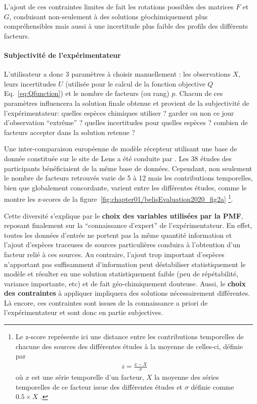 L'ajout de ces contraintes limites de fait les rotations possibles des matrices $F$ et
$G$, conduisant non-seulement à des solutions géochimiquement plus compréhensibles mais
aussi à une incertitude plus faible des profils des différents facteurs.

\paragraph{Subjectivité de l'expérimentateur}%
\label{par:subjectivité_de_l_expérimentateur}

L'utilisateur a donc 3 paramètres à choisir manuellement : les observations $X$, leurs
incertitudes $U$ (utilisée pour le calcul de la fonction objective $Q$
Eq.~\ref{eq:Qfunction}) et le nombre de facteurs (ou rang) $p$. Chacun de ces paramètres
influencera la solution finale obtenue et provient de la subjectivité de l'expérimentateur:
quelles espèces chimiques utiliser ? garder ou non ce jour d'observation ``extrême'' ?
quelles incertitudes pour quelles espèces ? combien de facteurs accepter dans la solution
retenue ?

Une inter-comparaison européenne de modèle récepteur utilisant une base de donnée
constituée sur le site de Lens a été conduite par
\cite{belisEvaluation2020}. Les 38 études des participants bénéficiaient de
la même base de données. Cependant, non seulement le nombre de facteurs retrouvés varie de 5 à 12 mais 
les contributions temporelles, bien que globalement concordante, varient entre les
différentes études, comme le montre les z-scores de la figure~\ref{fig:chapter01/belisEvaluation2020_fig2a}
\footnote{Le z-score représente ici une distance entre les contributions temporelles de
    chacune des sources des différentes études à la moyenne de celles-ci, définie par 
    \begin{align}
        \label{eq:z-score}
        z = \frac{x-X}{\sigma}
    \end{align}
    où $x$ est une série temporelle d'un facteur, $X$ la moyenne des séries temporelles de
    ce facteur issue des différentes études et $\sigma$ définie comme $0.5\times X$
    \parencite{pernigottiDeltaSA2018}.
}.

Cette diversité s'explique par le \textbf{choix des variables utilisées par la PMF},
reposant finalement sur la ``connaissance d'expert'' de l'expérimentateur. En effet, toutes les données
d'entrée ne portent pas la même quantité information et l'ajout d'espèces traceuses de
sources particulières conduira à l'obtention d'un facteur relié à ces sources. Au
contraire, l'ajout trop important d'espèces n'apportant pas suffisamment d'information peut
déstabiliser statistiquement le modèle et résulter en une solution statistiquement faible
(peu de répétabilité, variance importante, etc) et de fait géo-chimiquement douteuse.
Aussi, le \textbf{choix des contraintes} à appliquer impliquera des solutions
nécessairement différentes. Là encore, ces contraintes sont issues de la connaissance a
priori de l'expérimentateur et sont donc en partie subjectives.


